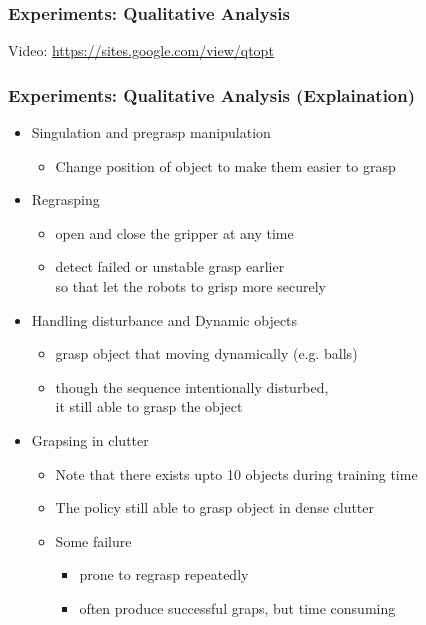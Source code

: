 \documentclass{beamer}
\newcommand{\sixthSec}{Experiments}
\begin{document}
    \begin{frame}
      \frametitle{\sixthSec : Qualitative Analysis}
      \centering
      Video: \url{https://sites.google.com/view/qtopt}
    \end{frame}

    \begin{frame}
      \frametitle{\sixthSec : Qualitative Analysis (Explaination)}
      \begin{itemize}
        \item Singulation and pregrasp manipulation
        \begin{itemize}
          \item Change position of object to make them easier to grasp
        \end{itemize}
        \item Regrasping
        \begin{itemize}
          \item open and close the gripper at any time
          \item detect failed or unstable grasp earlier \\
                so that let the robots to grisp more securely
        \end{itemize}
        \item Handling disturbance and Dynamic objects
        \begin{itemize}
          \item grasp object that moving dynamically (e.g. balls)
          \item though the sequence intentionally disturbed, \\ 
                it still able to grasp the object
        \end{itemize}
        \item Grapsing in clutter
        \begin{itemize}
          \item Note that there exists upto 10 objects during training time
          \item The policy still able to grasp object in dense clutter
          \item Some failure
          \begin{itemize}
            \item prone to regrasp repeatedly
            \item often produce successful graps, but time consuming
          \end{itemize}
        \end{itemize}
      \end{itemize}
    \end{frame}
\end{document}
